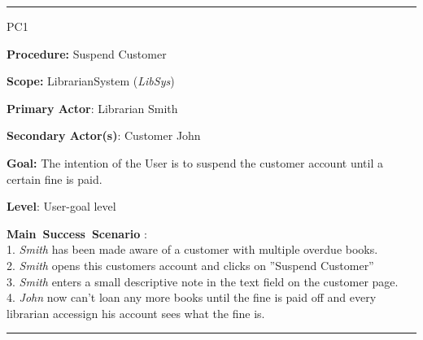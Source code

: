 \vspace{0.5cm}
\hrule
\begin{lyxlist}{PC1}
\small{
\item [\textbf{Procedure:}] Suspend Customer
\item [\textbf{Scope:}] LibrarianSystem (\emph{LibSys})
\item [\textbf{Primary Actor}:] Librarian Smith
\item [\textbf{Secondary Actor(s)}:] Customer John
\item [\textbf{Goal:}] The intention of the User is to suspend the customer
account until a certain fine is paid.
\item [\textbf{Level}:] User-goal level
\item [\textbf{Main~Success~Scenario}]:\\
1. \emph{Smith} has been made aware of a customer with multiple
overdue books.\\
2. \emph{Smith} opens this customers account and clicks on ''Suspend
Customer''\\
3. \emph{Smith} enters a small descriptive note in the text field on the
customer page.\\
4. \emph{John} now can't loan any more books until the fine is paid off and
every librarian accessign his account sees what the fine is.\\

}

\end{lyxlist}
\hrule

